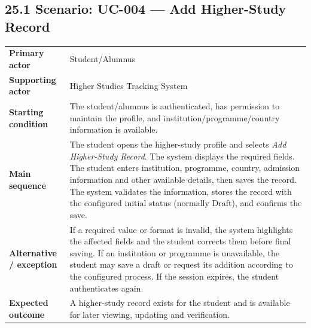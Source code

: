 \documentclass[12pt,a4paper]{article}
\begin{document}
\subsection*{25.1 Scenario: UC-004 --- Add Higher-Study Record}
\begin{tabularx}{\textwidth}{>{\bfseries}p{3.2cm} X}
Primary actor & Student/Alumnus\\
Supporting actor & Higher Studies Tracking System\\
Starting condition & The student/alumnus is authenticated, has permission to maintain the profile, and institution/programme/country information is available.\\
Main sequence & The student opens the higher-study profile and selects \emph{Add Higher-Study Record}. The system displays the required fields. The student enters institution, programme, country, admission information and other available details, then saves the record. The system validates the information, stores the record with the configured initial status (normally Draft), and confirms the save.\\
Alternative / exception & If a required value or format is invalid, the system highlights the affected fields and the student corrects them before final saving. If an institution or programme is unavailable, the student may save a draft or request its addition according to the configured process. If the session expires, the student authenticates again.\\
Expected outcome & A higher-study record exists for the student and is available for later viewing, updating and verification.\\
\end{tabularx}
\end{document}
